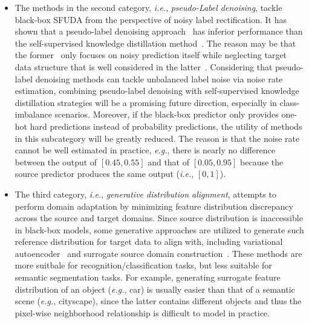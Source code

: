 \documentclass[10pt,journal,compsoc]{IEEEtran}
\def\eg{{\em e.g.}}
\def\ie{{\em i.e.}}
\begin{document}
\begin{itemize}[leftmargin=*]
\item The methods in the second category, \ie, \emph{pseudo-Label denoising}, tackle black-box SFUDA from the perspective of noisy label rectification.
It has shown that a pseudo-label denoising approach~\cite{zhang2021unsupervised} has inferior performance than the self-supervised knowledge distillation method~\cite{liang2022dine}.
The reason may be that the former~\cite{zhang2021unsupervised} only focuses on noisy prediction itself while neglecting target data structure that is well considered in the latter~\cite{liang2022dine}.
Considering that pseudo-label denoising methods can tackle unbalanced label noise via noise rate estimation, combining pseudo-label denoising with self-supervised knowledge distillation strategies will be a promising future direction, especially in class-imbalance scenarios. %
Moreover, if the black-box predictor only provides one-hot hard predictions instead of probability predictions, the utility of methods in this subcategory will be greatly reduced. %
The reason is that the noise rate cannot be well estimated in practice, \eg, there is nearly no difference between the output of $[0.45, 0.55]$ and that of $[0.05, 0.95]$ because the source predictor produces the same output (\ie, $[0, 1]$).

\item The third category, \ie, \emph{generative distribution alignment}, attempts to perform domain adaptation by minimizing feature distribution discrepancy across the source and target domains.
Since source distribution is inaccessible in black-box models, some generative approaches are utilized to generate such reference distribution for target data to align with, including variational autoencoder~\cite{yeh2021sofa, yang2021model} and surrogate source domain construction~\cite{zhang2022lightweight}.
These methods are more suitbale for recognition/classification tasks, but less suitable for %
semantic segmentation tasks.
For example, generating surrogate feature distribution of an object (\eg, car) is usually easier than that of a semantic scene (\eg, cityscape), since the latter contains different objects and thus the pixel-wise neighborhood relationship is difficult to model in practice.
\end{itemize}
\end{document}

